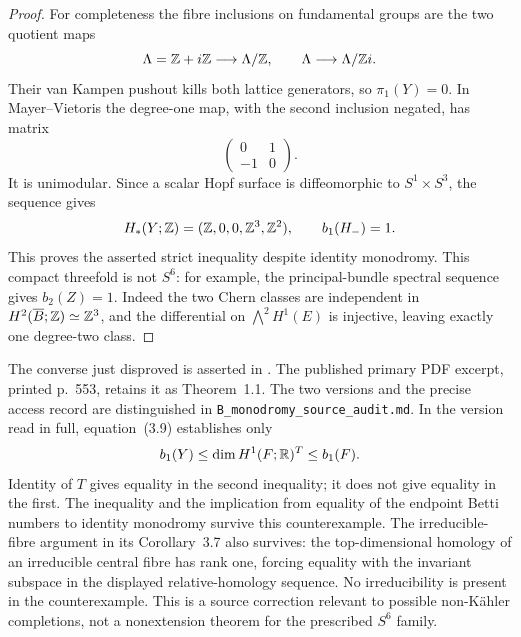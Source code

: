 \begin{proof}
For completeness the fibre inclusions on fundamental groups
are the two quotient maps
\[
 \Lambda=\mathbb Z+i\mathbb Z\longrightarrow\Lambda/\mathbb Z,
 \qquad
 \Lambda\longrightarrow\Lambda/\mathbb Z i.
\]
Their van Kampen pushout kills both lattice generators, so
$\pi_1(Y)=0$.  In Mayer--Vietoris the degree-one map, with
the second inclusion negated, has matrix
\[
 \begin{pmatrix}0&1\\-1&0\end{pmatrix}.
\]
It is unimodular.  Since a scalar Hopf surface is diffeomorphic
to $S^1\times S^3$, the sequence gives
\[
 H_*(Y;\mathbb Z)=(\mathbb Z,0,0,\mathbb Z^3,\mathbb Z^2),\qquad b_1(H_-)=1.
\]
This proves the asserted strict inequality despite identity
monodromy.  This compact threefold is not $S^6$: for example,
the principal-bundle spectral sequence gives $b_2(Z)=1$.
Indeed the two Chern classes are independent in
$H^2(\overline B;\mathbb Z)\simeq\mathbb Z^3$, and the differential on
$\bigwedge^2H^1(E)$ is injective, leaving exactly one
degree-two class.
\end{proof}

\begin{remark}
The converse just disproved is asserted in
\citet[Theorems 1.2 and 3.2, arXiv version~1]{HondaViaclovsky2025D}.
The published primary PDF excerpt, printed p.~553,
retains it as Theorem~1.1.  The two versions and the precise
access record are distinguished in
\texttt{B\_monodromy\_source\_audit.md}.
In the version read in full, equation~(3.9) establishes only
\[
 b_1(Y)\leq\dim H^1(F;\mathbb R)^{T}\leq b_1(F).
\]
Identity of $T$ gives equality in the second inequality;
it does not give equality in the first.  The inequality and
the implication from equality of the endpoint Betti numbers
to identity monodromy survive this counterexample.
The irreducible-fibre argument in its Corollary~3.7 also
survives: the top-dimensional homology of an irreducible
central fibre has rank one, forcing equality with the
invariant subspace in the displayed relative-homology
sequence.  No irreducibility is present in the counterexample.
This is a source correction relevant to possible
non-K\"ahler completions, not a nonextension theorem for
the prescribed $S^6$ family.
\end{remark}
